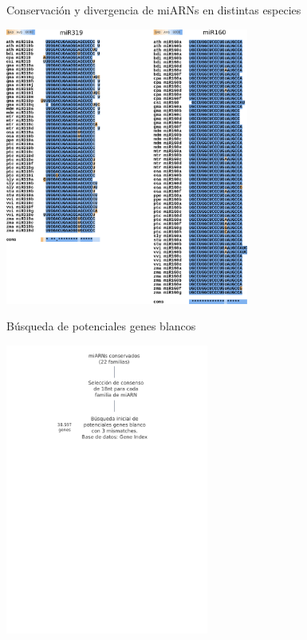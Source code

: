 \documentclass{beamer}
\begin{document}
\begin{frame}{Conservación y divergencia de miARNs en distintas especies}
	\begin{center}
		\includegraphics[width=0.6\textwidth]{img/variabilidad_maduro.png}
	\end{center}
\end{frame}

\begin{frame}{Búsqueda de potenciales genes blancos}
	\begin{center}
		\includegraphics[width=0.5\textwidth]{img/NAR_fig1_03.png}
	\end{center}
\end{frame}
\end{document}

